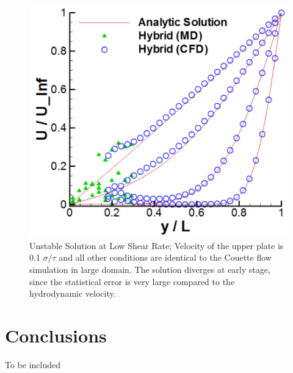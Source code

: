 \documentclass[preprint,12pt]{elsarticle}
\begin{document}
\begin{figure}
\centering
\includegraphics[width=0.6\linewidth]{Couette_Noisy.pdf}
\vskip-0.2cm
\caption{\small Unstable Solution at Low Shear Rate; Velocity of the upper plate is 0.1 $\sigma / \tau$ and all other conditions are identical to the Couette flow simulation in large domain. The solution diverges at early stage, since the statistical error is very large compared to the hydrodynamic velocity.}
\label{Stokes_Sol}
\end{figure}



\section{Conclusions}
To be included















\end{document}
